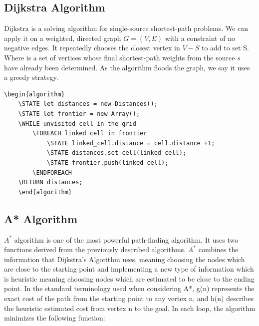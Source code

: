 \subsection{Dijkstra Algorithm}
Dijkstra is a solving algorithm for single-source shortest-path problems. We can apply it on a weighted, directed graph $G=(V, E)$ with a constraint of no negative edges. 
It repeatedly chooses the closest vertex in $V-S$ to add to set S. 
Where  is a set of vertices whose final shortest-path weights from the source \textit{s} have already been determined.
As the algorithm floods the graph, we say it uses a greedy strategy.
\begin{lstlisting}[caption={Pseudocode for a Dijkstra’s algorithm}]
	\begin{algorithm}
	\STATE let distances = new Distances();
	\STATE let frontier = new Array();
	\WHILE unvisited cell in the grid
		\FOREACH linked cell in frontier
			\STATE linked_cell.distance = cell.distance +1;
			\STATE distances.set_cell(linked_cell);
			\STATE frontier.push(linked_cell);
	    \ENDFOREACH
	\RETURN distances;
	\end{algorithm}
	\end{lstlisting}

\subsection{A* Algorithm}
$A^*$ algorithm is one of the most powerful path-finding algorithm. It uses two functions derived from the previously described algorithms. $A^*$ combines the information that Dijkstra’s Algorithm uses, meaning choosing the nodes which are close to the starting point and implementing a new type of information which is heuristic meaning choosing nodes which are estimated to be close to the ending point. In the standard terminology used when considering A*, g(n) represents the exact cost of the path from the starting point to any vertex n, and h(n) describes the heuristic estimated cost from vertex n to the goal. In each loop, the algorithm minimizes the following function:

